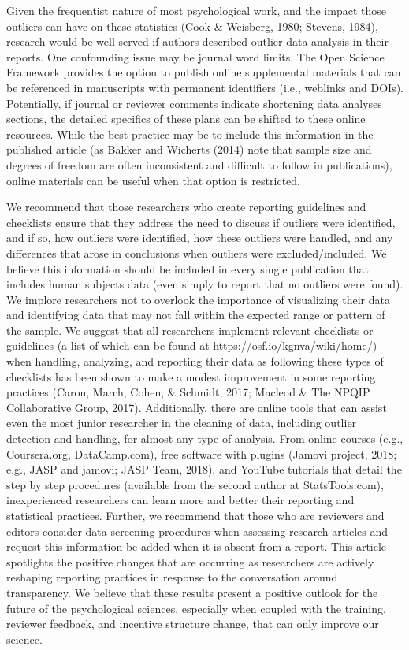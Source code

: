 \documentclass[english,,man]{apa6}
\theoremstyle{definition}
\theoremstyle{definition}
\theoremstyle{definition}
\theoremstyle{remark}
\begin{document}
Given the frequentist nature of most psychological work, and the impact
those outliers can have on these statistics (Cook \& Weisberg, 1980;
Stevens, 1984), research would be well served if authors described
outlier data analysis in their reports. One confounding issue may be
journal word limits. The Open Science Framework provides the option to
publish online supplemental materials that can be referenced in
manuscripts with permanent identifiers (i.e., weblinks and DOIs).
Potentially, if journal or reviewer comments indicate shortening data
analyses sections, the detailed specifics of these plans can be shifted
to these online resources. While the best practice may be to include
this information in the published article (as Bakker and Wicherts (2014)
note that sample size and degrees of freedom are often inconsistent and
difficult to follow in publications), online materials can be useful
when that option is restricted.

We recommend that those researchers who create reporting guidelines and
checklists ensure that they address the need to discuss if outliers were
identified, and if so, how outliers were identified, how these outliers
were handled, and any differences that arose in conclusions when
outliers were excluded/included. We believe this information should be
included in every single publication that includes human subjects data
(even simply to report that no outliers were found). We implore
researchers not to overlook the importance of visualizing their data and
identifying data that may not fall within the expected range or pattern
of the sample. We suggest that all researchers implement relevant
checklists or guidelines (a list of which can be found at
\url{https://osf.io/kgnva/wiki/home/}) when handling, analyzing, and
reporting their data as following these types of checklists has been
shown to make a modest improvement in some reporting practices (Caron,
March, Cohen, \& Schmidt, 2017; Macleod \& The NPQIP Collaborative
Group, 2017). Additionally, there are online tools that can assist even
the most junior researcher in the cleaning of data, including outlier
detection and handling, for almost any type of analysis. From online
courses (e.g., Coursera.org, DataCamp.com), free software with plugins
(Jamovi project, 2018; e.g., JASP and jamovi; JASP Team, 2018), and
YouTube tutorials that detail the step by step procedures (available
from the second author at StatsTools.com), inexperienced researchers can
learn more and better their reporting and statistical practices.
Further, we recommend that those who are reviewers and editors consider
data screening procedures when assessing research articles and request
this information be added when it is absent from a report. This article
spotlights the positive changes that are occurring as researchers are
actively reshaping reporting practices in response to the conversation
around transparency. We believe that these results present a positive
outlook for the future of the psychological sciences, especially when
coupled with the training, reviewer feedback, and incentive structure
change, that can only improve our science.
\end{document}
